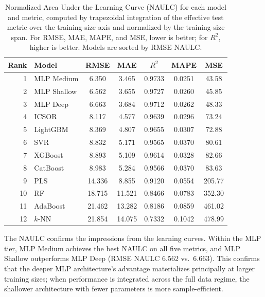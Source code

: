 \documentclass[11pt]{article}
\begin{document}
\begin{table}[htbp]
\centering
\caption{Normalized Area Under the Learning Curve (NAULC) for each model and metric, computed by trapezoidal integration of the effective test metric over the training-size axis and normalized by the training-size span. For RMSE, MAE, MAPE, and MSE, lower is better; for $R^2$, higher is better. Models are sorted by RMSE NAULC.}
\label{tab:naulc}
\small
\begin{tabular}{@{}rlccccc@{}}
\toprule
\textbf{Rank} & \textbf{Model} & \textbf{RMSE} & \textbf{MAE} & \textbf{$R^2$} & \textbf{MAPE} & \textbf{MSE} \\
\midrule
1  & MLP Medium   & 6.350 & 3.465 & 0.9733 & 0.0251 & 43.58  \\
2  & MLP Shallow  & 6.562 & 3.655 & 0.9727 & 0.0260 & 45.85  \\
3  & MLP Deep     & 6.663 & 3.684 & 0.9712 & 0.0262 & 48.33  \\
4  & ICSOR        & 8.117 & 4.577 & 0.9639 & 0.0296 & 73.24  \\
5  & LightGBM     & 8.369 & 4.807 & 0.9655 & 0.0307 & 72.88  \\
6  & SVR          & 8.832 & 5.171 & 0.9565 & 0.0370 & 80.61  \\
7  & XGBoost      & 8.893 & 5.109 & 0.9614 & 0.0328 & 82.66  \\
8  & CatBoost     & 8.983 & 5.284 & 0.9566 & 0.0370 & 83.63  \\
9  & PLS          & 14.336 & 8.855 & 0.9120 & 0.0554 & 205.77 \\
10 & RF           & 18.715 & 11.521 & 0.8466 & 0.0783 & 352.30 \\
11 & AdaBoost     & 21.462 & 13.282 & 0.8186 & 0.0859 & 461.02 \\
12 & $k$-NN       & 21.854 & 14.075 & 0.7332 & 0.1042 & 478.99 \\
\bottomrule
\end{tabular}
\end{table}

The NAULC confirms the impressions from the learning curves. Within the MLP tier, MLP Medium achieves the best NAULC on all five metrics, and MLP Shallow outperforms MLP Deep (RMSE NAULC 6.562 vs.\ 6.663). This confirms that the deeper MLP architecture's advantage materializes principally at larger training sizes; when performance is integrated across the full data regime, the shallower architecture with fewer parameters is more sample-efficient.
\end{document}
